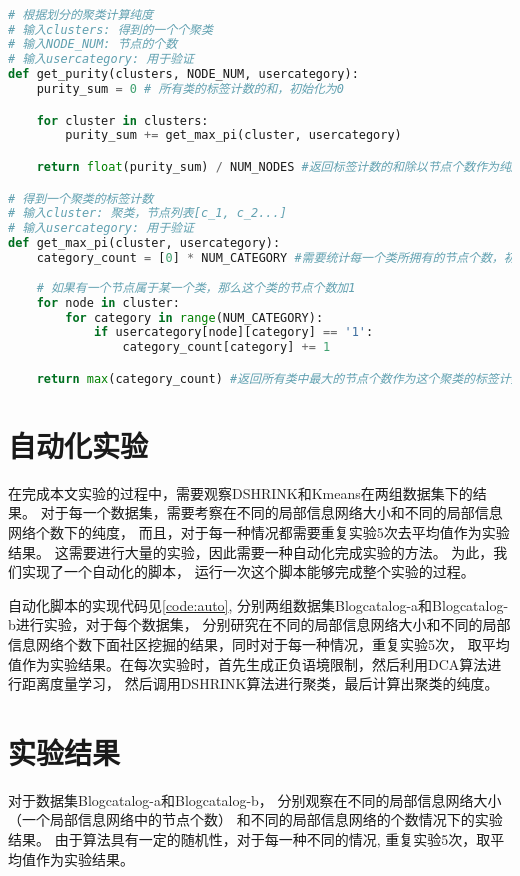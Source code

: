 \begin{lstlisting}[language={python}, caption={计算聚类的纯度}, label=code:purity]

# 根据划分的聚类计算纯度
# 输入clusters: 得到的一个个聚类
# 输入NODE_NUM: 节点的个数
# 输入usercategory: 用于验证
def get_purity(clusters, NODE_NUM, usercategory):
    purity_sum = 0 # 所有类的标签计数的和，初始化为0

    for cluster in clusters:
        purity_sum += get_max_pi(cluster, usercategory)

    return float(purity_sum) / NUM_NODES #返回标签计数的和除以节点个数作为纯度

# 得到一个聚类的标签计数
# 输入cluster: 聚类，节点列表[c_1, c_2...] 
# 输入usercategory: 用于验证
def get_max_pi(cluster, usercategory):
    category_count = [0] * NUM_CATEGORY #需要统计每一个类所拥有的节点个数，初始化都为0
    
    # 如果有一个节点属于某一个类，那么这个类的节点个数加1
    for node in cluster:
        for category in range(NUM_CATEGORY):
            if usercategory[node][category] == '1':
                category_count[category] += 1

    return max(category_count) #返回所有类中最大的节点个数作为这个聚类的标签计数

\end{lstlisting}


\section{自动化实验}

在完成本文实验的过程中，需要观察DSHRINK和Kmeans在两组数据集下的结果。
对于每一个数据集，需要考察在不同的局部信息网络大小和不同的局部信息网络个数下的纯度，
而且，对于每一种情况都需要重复实验5次去平均值作为实验结果。
这需要进行大量的实验，因此需要一种自动化完成实验的方法。
为此，我们实现了一个自动化的脚本，
运行一次这个脚本能够完成整个实验的过程。

自动化脚本的实现代码见\ref{code:auto}, 分别两组数据集Blogcatalog-a和Blogcatalog-b进行实验，对于每个数据集，
分别研究在不同的局部信息网络大小和不同的局部信息网络个数下面社区挖掘的结果，同时对于每一种情况，重复实验5次，
取平均值作为实验结果。在每次实验时，首先生成正负语境限制，然后利用DCA算法进行距离度量学习，
然后调用DSHRINK算法进行聚类，最后计算出聚类的纯度。

\section{实验结果}
\label{sec:results}
对于数据集Blogcatalog-a和Blogcatalog-b，
分别观察在不同的局部信息网络大小（一个局部信息网络中的节点个数）
和不同的局部信息网络的个数情况下的实验结果。
由于算法具有一定的随机性，对于每一种不同的情况,
重复实验5次，取平均值作为实验结果。

